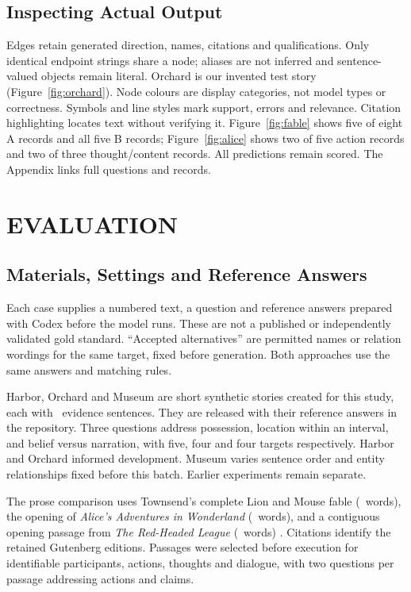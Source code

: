 \documentclass[a4paper,twoside]{article}
\begin{document}
\subsection{Inspecting Actual Output}
\noindent Edges retain generated direction, names, citations and qualifications. Only identical endpoint strings share a node; aliases are not inferred and sentence-valued objects remain literal. Orchard is our invented test story (Figure~\ref{fig:orchard}). Node colours are display categories, not model types or correctness. Symbols and line styles mark support, errors and relevance. Citation highlighting locates text without verifying it. Figure~\ref{fig:fable} shows five of eight A records and all five B records; Figure~\ref{fig:alice} shows two of five action records and two of three thought/content records. All predictions remain scored. The Appendix links full questions and records.
\FableFigure





\section{\uppercase{Evaluation}}




\subsection{Materials, Settings and Reference Answers}
\noindent Each case supplies a numbered text, a question and reference answers prepared with Codex before the model runs. These are not a published or independently validated gold standard. ``Accepted alternatives'' are permitted names or relation wordings for the same target, fixed before generation. Both approaches use the same answers and matching rules.

Harbor, Orchard and Museum are short synthetic stories created for this study, each with \StorySentences\ evidence sentences. They are released with their reference answers in the repository. Three questions address possession, location within an interval, and belief versus narration, with five, four and four targets respectively. Harbor and Orchard informed development. Museum varies sentence order and entity relationships fixed before this batch. Earlier experiments remain separate.

The prose comparison uses Townsend's complete Lion and Mouse fable (\FableWords\ words), the opening of \emph{Alice's Adventures in Wonderland} (\AliceWords\ words), and a contiguous opening passage from \emph{The Red-Headed League} (\HolmesWords\ words) \cite{aesop,carroll,doyle}. Citations identify the retained Gutenberg editions. Passages were selected before execution for identifiable participants, actions, thoughts and dialogue, with two questions per passage addressing actions and claims.
\end{document}
